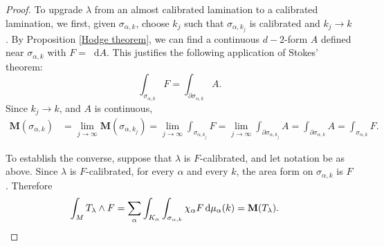 \documentclass[reqno,11pt]{amsart}
\newcommand*\dif{\mathop{}\!\mathrm{d}}
\newcommand{\Mass}{\mathbf M}
\newtheorem{proposition}[theorem]{Proposition}
\theoremstyle{definition}
\numberwithin{equation}{section}
\begin{document}
\begin{proof}
To upgrade $\lambda$ from an almost calibrated lamination to a calibrated lamination, we first, given $\sigma_{\alpha, k}$, choose $k_j$ such that $\sigma_{\alpha, k_j}$ is calibrated and $k_j \to k$.
By Proposition \ref{Hodge theorem}, we can find a continuous $d - 2$-form $A$ defined near $\sigma_{\alpha, k}$ with $F = \dif A$.
This justifies the following application of Stokes' theorem: 
$$\int_{\sigma_{\alpha, k}} F = \int_{\partial \sigma_{\alpha, k}} A.$$
Since $k_j \to k$, and $A$ is continuous,
\begin{align*}
\Mass(\sigma_{\alpha, k}) &= \lim_{j \to \infty} \Mass(\sigma_{\alpha, k_j}) = \lim_{j \to \infty} \int_{\sigma_{\alpha, k_j}} F = \lim_{j \to \infty} \int_{\partial \sigma_{\alpha, k_j}} A = \int_{\partial \sigma_{\alpha, k}} A = \int_{\sigma_{\alpha, k}} F.
\end{align*}

To establish the converse, suppose that $\lambda$ is $F$-calibrated, and let notation be as above.
Since $\lambda$ is $F$-calibrated, for every $\alpha$ and every $k$, the area form on $\sigma_{\alpha, k}$ is $F$. Therefore
\begin{align*}
\int_M T_\lambda \wedge F &= \sum_\alpha \int_{K_\alpha} \int_{\sigma_{\alpha, k}} \chi_\alpha F \dif \mu_\alpha(k) = \Mass(T_\lambda). \qedhere
\end{align*}
\end{proof}




\end{document}
